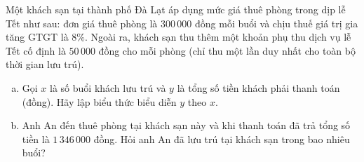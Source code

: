 \begin{bt}%
Một khách sạn tại thành phố Đà Lạt áp dụng mức giá thuê phòng trong dịp lễ Tết như sau: đơn giá thuê phòng là $300\,000$ đồng mỗi buổi và chịu thuế giá trị gia tăng GTGT là $8\%$. Ngoài ra, khách sạn thu thêm một khoản phụ thu dịch vụ lễ Tết cố định là $50\,000$ đồng cho mỗi phòng (chỉ thu một lần duy nhất cho toàn bộ thời gian lưu trú).
\begin{enumerate}[a)]
    \item Gọi $x$ là số buổi khách lưu trú và $y$ là tổng số tiền khách phải thanh toán (đồng). Hãy lập biểu thức biểu diễn $y$ theo $x$.
    \item Anh An đến thuê phòng tại khách sạn này và khi thanh toán đã trả tổng số tiền là $1\,346\,000$ đồng. Hỏi anh An đã lưu trú tại khách sạn trong bao nhiêu buổi?
\end{enumerate}
\end{bt}

